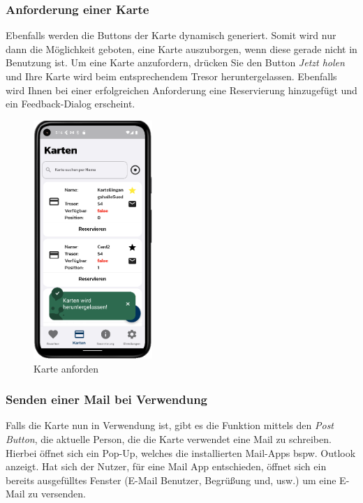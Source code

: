 \subsubsection{Anforderung einer Karte}
Ebenfalls werden die Buttons der Karte dynamisch generiert. Somit wird nur dann die Möglichkeit geboten, eine Karte auszuborgen, wenn diese gerade nicht in Benutzung ist. Um eine Karte anzufordern, drücken Sie den Button {\textit{Jetzt holen}} und Ihre Karte wird beim entsprechendem Tresor heruntergelassen. Ebenfalls wird Ihnen bei einer erfolgreichen Anforderung eine Reservierung hinzugefügt und ein Feedback-Dialog erscheint.
\begin{figure}[!h]
\centering
\includegraphics[width=0.4\textwidth]{FLUTTER/images/GP/Client_Get_Card.png}
\caption{Karte anforden}
\end{figure}
\newpage


\subsubsection{Senden einer Mail bei Verwendung}
Falls die Karte nun in Verwendung ist, gibt es die Funktion mittels den {\textit{Post Button}}, die aktuelle Person, die die Karte verwendet eine Mail zu schreiben. Hierbei öffnet sich ein Pop-Up, welches die installierten Mail-Apps bspw. Outlook anzeigt. Hat sich der Nutzer, für eine Mail App entschieden, öffnet sich ein bereits ausgefülltes Fenster (E-Mail Benutzer, Begrüßung und, usw.) um eine E-Mail zu versenden.


